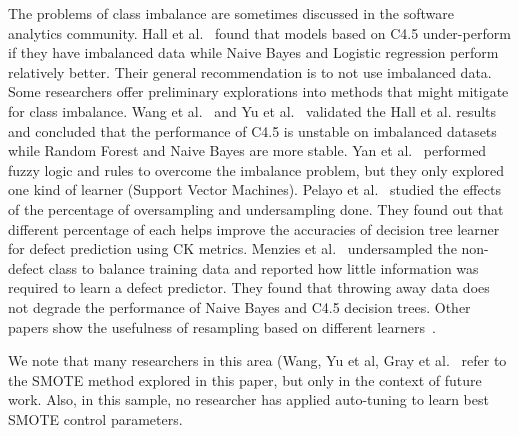 \documentclass[10pt,conference]{IEEEtran}
\theoremstyle{break}
\theoremstyle{break}
\newcommand{\sma}{{\sc SMOTE}}
\begin{document}
The problems of class imbalance are sometimes discussed in the software analytics community.
Hall et al.~\cite{hall2012systematic} found that models based on C4.5 under-perform if they have imbalanced data while Naive Bayes and Logistic regression perform relatively better. 
Their general recommendation is to not use
imbalanced data.  
Some researchers offer preliminary explorations into methods that might mitigate for class imbalance.
Wang et al.~\cite{wang2013using} and Yu et al.~\cite{yuperformance} validated the Hall et al. results and concluded that the
performance of C4.5 is unstable on imbalanced datasets while  Random Forest and Naive Bayes are 
more stable. 
Yan et al.~\cite{yan2010software} performed fuzzy logic and rules to overcome the imbalance problem, but they only
explored one kind of learner (Support Vector Machines).
Pelayo et al.~\cite{pelayo2007applying} studied the effects of the percentage of oversampling and undersampling done. They found out that different percentage of each helps improve the accuracies of decision tree learner for defect prediction using CK metrics. Menzies et al.~\cite{menzies2008implications} undersampled the non-defect class to balance training
data and reported how little information was required to learn a defect predictor. They found that throwing away data does not degrade the performance of Naive Bayes and C4.5 decision trees. Other papers show the usefulness of resampling based on different learners~\cite{pelayo2007applying, pelayo2012evaluating, riquelme2008finding}.

We note that  
many researchers in this area  (Wang, Yu et al, Gray et al.~\cite{gray2009using,yuperformance,wang2013using} refer to the {\sma} method explored in this paper,  but only in the context of future work. 
Also, 
in this sample, no researcher has  applied auto-tuning to learn best {\sma} control parameters. 
\end{document}
